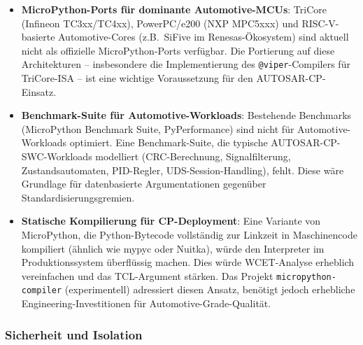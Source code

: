 ﻿\documentclass[12pt,a4paper,twoside]{article}
\begin{document}
\begin{itemize}
  \item \textbf{MicroPython-Ports für dominante Automotive-MCUs}:
        TriCore (Infineon TC3xx/TC4xx), PowerPC/e200 (NXP MPC5xxx)
        und RISC-V-basierte Automotive-Cores (z.B.\ SiFive im
        Renesas-Ökosystem) sind aktuell nicht als offizielle MicroPython-Ports
        verfügbar.
        Die Portierung auf diese Architekturen -- insbesondere die
        Implementierung des \texttt{@viper}-Compilers für TriCore-ISA --
        ist eine wichtige Voraussetzung für den AUTOSAR-CP-Einsatz.

  \item \textbf{Benchmark-Suite für Automotive-Workloads}:
        Bestehende Benchmarks (MicroPython Benchmark Suite, PyPerformance)
        sind nicht für Automotive-Workloads optimiert.
        Eine Benchmark-Suite, die typische AUTOSAR-CP-SWC-Workloads modelliert
        (CRC-Berechnung, Signalfilterung, Zustandsautomaten, PID-Regler,
        UDS-Session-Handling), fehlt.
        Diese wäre Grundlage für datenbasierte Argumentationen
        gegenüber Standardisierungsgremien.

  \item \textbf{Statische Kompilierung für CP-Deployment}:
        Eine Variante von MicroPython, die Python-Bytecode vollständig
        zur Linkzeit in Maschinencode kompiliert (ähnlich wie mypyc oder Nuitka),
        würde den Interpreter im Produktionssystem überflüssig machen.
        Dies würde WCET-Analyse erheblich vereinfachen und das TCL-Argument stärken.
        Das Projekt \texttt{micropython-compiler} (experimentell) adressiert
        diesen Ansatz, benötigt jedoch erhebliche Engineering-Investitionen
        für Automotive-Grade-Qualität.
\end{itemize}

\subsubsection{Sicherheit und Isolation}
\end{document}
